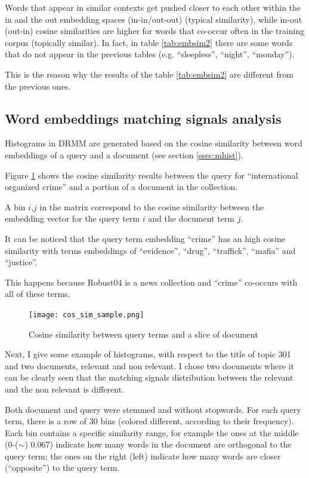 Words that appear in similar contexts get pushed closer to each other within the in and the out embedding spaces (in-in/out-out) (typical similarity), while in-out (out-in) cosine similarities are higher for words that co-occur often in the training corpus (topically similar). In fact, in table \ref{tab:embsim2} there are some words that do not appear in the previous tables (e.g. ``sleepless'', ``night'', ``monday'').

This is the reason why the results of the table \ref{tab:embsim2} are different from the previous ones.

\subsection{Word embeddings matching signals analysis}

Histograms in DRMM are generated based on the cosine similarity between word embeddings of a query and a document (see section \ref{ssec:mhist}).

Figure \ref{fig:cos_sim_sample} shows the cosine similarity results between the query for ``international organized crime'' and a portion of a document in the collection.

A bin $i$,$j$ in the matrix correspond to the cosine similarity between the embedding vector for the query term $i$ and the document term $j$.

It can be noticed that the query term embedding ``crime'' has an high cosine similarity with terms embeddings of ``evidence'', ``drug'', ``traffick'', ``mafia'' and ``justice''.

This happens because Robust04 \cite{rob04} is a news collection and ``crime'' co-occurs with all of these terms.

\begin{figure}[H]
  \centering
  \texttt{[image: cos\_sim\_sample.png]}
  \caption{Cosine similarity between query terms and a slice of document}
  \label{fig:cos_sim_sample}
\end{figure}

Next, I give some example of histograms, with respect to the title of topic 301 and two documents, relevant and non relevant. I chose two documents where it can be clearly seen that the matching signals distribution between the relevant and the non relevant is different.

Both document and query were stemmed and without stopwords. For each query term, there is a row of 30 bins (colored different, according to their frequency). Each bin contains a specific similarity range, for
example the ones at the middle (0-($\sim$) 0.067) indicate how many words in the document are orthogonal to the query term; the ones on the right (left) indicate how many words are closer (``opposite'') to the query term.

